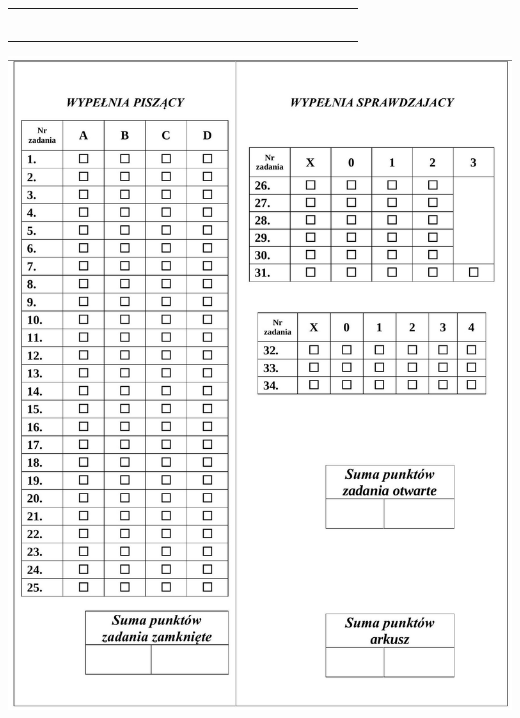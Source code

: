 \documentclass[10pt]{article}
\begin{document}
\begin{center}
\begin{tabular}{|c|c|c|c|c|c|c|c|c|c|c|c|c|c|c|c|c|c|c|c|c|c|c|c|c|}
\hline
 &  &  &  &  &  &  &  &  &  &  &  &  &  &  &  &  &  &  &  &  &  &  &  &  \\
\hline
 &  &  &  &  &  &  &  &  &  &  &  &  &  &  &  &  &  &  &  &  &  &  &  &  \\
\hline
 &  &  &  &  &  &  &  &  &  &  &  &  &  &  &  &  &  &  &  &  &  &  &  &  \\
\hline
 &  &  &  &  &  &  &  &  &  &  &  &  &  &  &  &  &  &  &  &  &  &  &  &  \\
\hline
 &  &  &  &  &  &  &  &  &  &  &  &  &  &  &  &  &  &  &  &  &  &  &  &  \\
\hline
 &  &  &  &  &  &  &  &  &  &  &  &  &  &  &  &  &  &  &  &  &  &  &  &  \\
\hline
 &  &  &  &  &  &  &  &  &  &  &  &  &  &  &  &  &  &  &  &  &  &  &  &  \\
\hline
\end{tabular}
\end{center}

\begin{center}
\includegraphics[max width=\textwidth]{2024_11_21_a68a2ba4fc31c5fb438eg-16}
\end{center}
\end{document}
